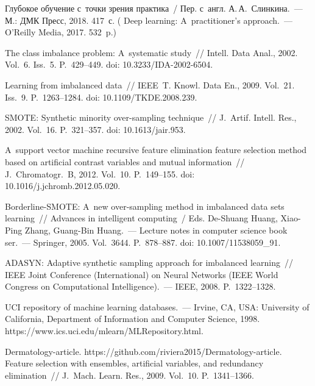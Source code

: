 \begin{multicols}{2}
{\small\frenchspacing
 {%
 \begin{thebibliography}{99}
 Глубокое обучение с~точки зрения практика~/ Пер. с~англ. 
А.\,А.~Слинкина.~--- М.: ДМК Пресс, 2018. 417~с. ( Deep 
learning: A~practitioner's approach.~--- O'Reilly Media, 2017. 532~p.)

The class imbalance problem: A~systematic study~// Intell. 
Data Anal., 2002. Vol.~6. Iss.~5. P.~429--449. doi: 10.3233/IDA-2002-6504.

 Learning from imbalanced data~// IEEE~T. Knowl. Data 
En., 2009. Vol.~21. Iss.~9. P.~1263--1284. doi: 10.1109/TKDE.2008.239.


 SMOTE: Synthetic minority 
over-sampling technique~// J.~Artif. Intell. Res., 2002. Vol.~16. P.~321--357. doi: 
10.1613/jair.953.

 A~support vector machine recursive feature elimination feature 
selection method based on artificial contrast variables and mutual information~// 
J.~Chromatogr.~B, 2012. 
Vol.~10. P.~149--155. doi: 10.1016/j.jchromb.2012.05.020.

 Borderline-SMOTE: 
A~new over-sampling method in 
imbalanced data sets learning~// Advances in
intelligent computing~/
Eds. De-Shuang Huang, Xiao-Ping Zhang, Guang-Bin Huang.~--- 
Lecture notes in computer science book ser.~--- Springer, 2005. Vol.~3644. P.~878--887. 
doi: 10.1007/11538059\_91.

 ADASYN: Adaptive synthetic sampling approach for 
imbalanced learning~// IEEE  Joint Conference (International) on Neural Networks (IEEE World 
Congress on Computational Intelligence).~--- IEEE, 2008. P.~1322--1328.

 UCI repository of machine learning databases.~--- 
Irvine, CA, USA: 
University of California, Department of Information and Computer Science, 
1998. {\sf 
https://www.ics.uci.edu/mlearn/\linebreak MLRepository.html}.


Dermatology-article. {\sf https://github.com/riviera2015/\linebreak Dermatology-article}.
 Feature selection with ensembles, artificial 
variables, and redundancy elimination~// J.~Mach. Learn. Res., 2009. Vol.~10.  
P.~1341--1366.


\end{thebibliography}}}
\end{multicols}
